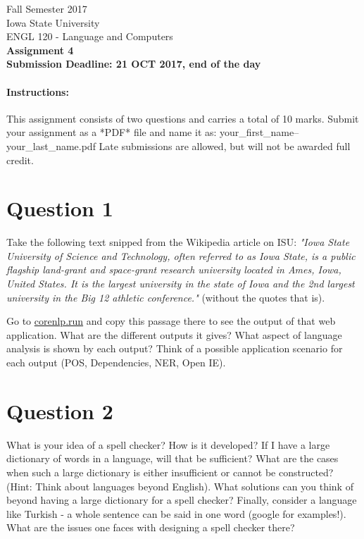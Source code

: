 \documentclass[11pt,a4paper]{article}
\begin{document}
\begin{center}
  Fall Semester 2017 \\ Iowa State University\\[3ex]
  {\large ENGL 120 - Language and Computers}\\[3ex]
  \textbf{Assignment 4} \\ \textbf{Submission Deadline: 21 OCT 2017, end of the day}
\end{center}


\paragraph{Instructions:} This assignment consists of two questions and carries a total of 10 marks. Submit your assignment as a *PDF* file and name it as: your\_first\_name--your\_last\_name.pdf Late submissions are allowed, but will not be awarded full credit. 

\section*{Question 1} 
Take the following text snipped from the Wikipedia article on ISU: 
\textit{"Iowa State University of Science and Technology, often referred to as Iowa State, is a public flagship land-grant and space-grant research university located in Ames, Iowa, United States. It is the largest university in the state of Iowa and the 2nd largest university in the Big 12 athletic conference."} (without the quotes that is). 

Go to \url{corenlp.run} and copy this passage there to see the output of that web application. What are the different outputs it gives? What aspect of language analysis is shown by each output? Think of a possible application scenario for each output (POS, Dependencies, NER, Open IE).

\section*{Question 2}
What is your idea of a spell checker? How is it developed? If I have a large dictionary of words in a language, will that be sufficient? What are the cases when such a large dictionary is either insufficient or cannot be constructed? (Hint: Think about languages beyond English). What solutions can you think of beyond having a large dictionary for a spell checker? Finally, consider a language like Turkish - a whole sentence can be said in one word (google for examples!). What are the issues one faces with designing a spell checker there?
\end{document}
